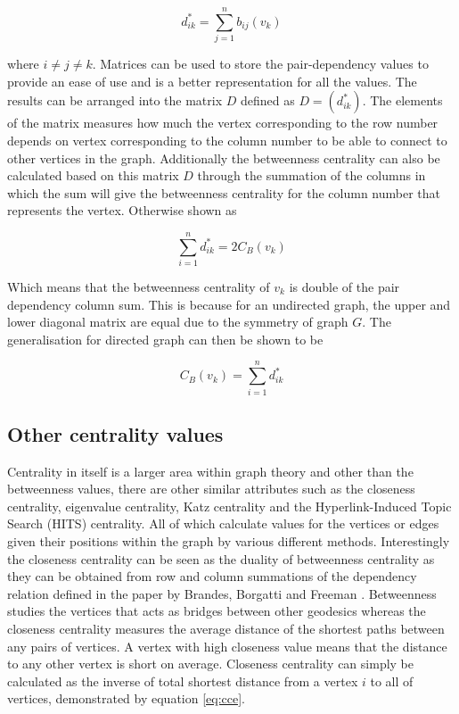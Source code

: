 \begin{equation}\label{eq:bcrmv}
d^*_{ik} = \sum_{j=1}^{n}b_{ij}(v_k)
\end{equation}

where $i \ne j \ne k$. Matrices can be used to store the pair-dependency values to provide an ease of use and is a better representation for all the values. The results can be arranged into the matrix $D$ defined as $D = (d^*_{ik})$. The elements of the matrix measures how much the vertex corresponding to the row number depends on vertex corresponding to the column number to be able to connect to other vertices in the graph. Additionally the betweenness centrality can also be calculated based on this matrix $D$ through the summation of the columns in which the sum will give the betweenness centrality for the column number that represents the vertex. Otherwise shown as

\begin{equation}
\sum_{i=1}^nd^*_{ik} = 2C_B(v_k)
\end{equation}

Which means that the betweenness centrality of $v_k$ is double of the pair dependency column sum\cite{white1994betweenness}. This is because for an undirected graph, the upper and lower diagonal matrix are equal due to the symmetry of graph $G$. The generalisation for directed graph can then be shown to be

\begin{equation}
C_B(v_k) = \sum_{i=1}^nd^*_{ik}
\end{equation}

\subsection{Other centrality values}
Centrality in itself is a larger area within graph theory and other than the betweenness values, there are other similar attributes such as the closeness centrality, eigenvalue centrality, Katz centrality \cite{katz1953new} and the Hyperlink-Induced Topic Search (HITS) centrality. All of which calculate values for the vertices or edges given their positions within the graph by various different methods. Interestingly the closeness centrality can be seen as the duality of betweenness centrality as they can be obtained from row and column summations of the dependency relation defined in the paper by Brandes, Borgatti and Freeman \cite{brandes2016maintaining}.
Betweenness studies the vertices that acts as bridges between other geodesics whereas the closeness centrality measures the average distance of the shortest paths between any pairs of vertices. A vertex with high closeness value means that the distance to any other vertex is short on average. Closeness centrality\cite{brandes2007centrality} can simply be calculated as the inverse of total shortest distance from a vertex $i$ to all of vertices, demonstrated by equation \ref{eq:cce}.

